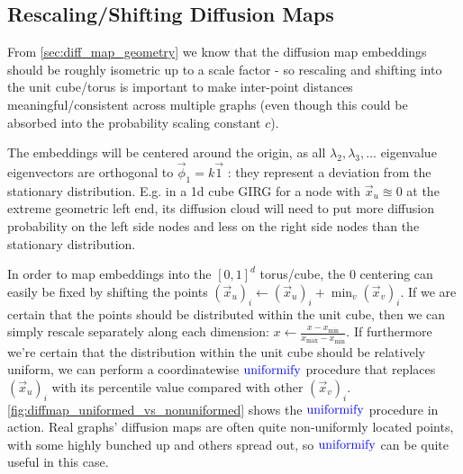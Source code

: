 \subsection{Rescaling/Shifting Diffusion Maps}
From \cref{sec:diff_map_geometry} we know that the diffusion map embeddings should be roughly isometric up to a scale factor - so rescaling and shifting into the unit cube/torus is important to make inter-point distances meaningful/consistent across multiple graphs (even though this could be absorbed into the probability scaling constant $c$).


The embeddings will be centered around the origin, as all $\lambda_2, \lambda_3, ...$ eigenvalue eigenvectors are orthogonal to $\vec{\phi}_1 = k \vec{1}$ : they represent a deviation from the stationary distribution. E.g. in a 1d cube GIRG for a node with $\vec{x}_u \approxeq 0$ at the extreme geometric left end, its diffusion cloud will need to put more diffusion probability on the left side nodes and less on the right side nodes than the stationary distribution.


In order to map embeddings into the $[0, 1]^d$ torus/cube, the 0 centering can easily be fixed by shifting the points $(\vec{x}_u)_i \gets (\vec{x}_u)_i + \min_v (\vec{x}_v)_i$.
If we are certain that the points should be distributed within the unit cube, then we can simply rescale separately along each dimension: $x \gets \frac{x - x_{\min}}{x_{\max} - x_{\min}}$.
If furthermore we're certain that the distribution within the unit cube should be relatively uniform, we can perform a coordinatewise $\operatorname{\textcolor{blue}{uniformify}}$ procedure that replaces $(\vec{x}_u)_i$ with its percentile value compared with other $(\vec{x}_v)_i$. \cref{fig:diffmap_uniformed_vs_nonuniformed} shows the $\operatorname{\textcolor{blue}{uniformify}}$ procedure in action.
Real graphs' diffusion maps are often quite non-uniformly located points, with some highly bunched up and others spread out, so $\operatorname{\textcolor{blue}{uniformify}}$ can be quite useful in this case.



